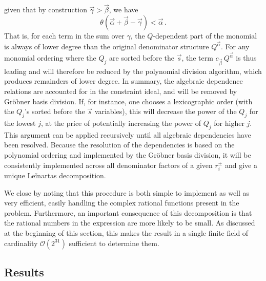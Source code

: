 given that by construction $\vec\gamma > \vec\beta$, we
have  
\begin{equation}
\theta(\vec\alpha + \vec\beta - \vec\gamma) < \vec\alpha\,.
\end{equation}
That is, for each term in the sum over $\gamma$, the $Q$-dependent part of the
monomial is always of lower degree than the original denominator 
structure $Q^{\vec{\alpha}}$.
For any monomial ordering where the $Q_j$ are sorted before the $\vec s$, the term  
$c_{\vec{\beta}}\,Q^{\vec{\alpha}}$ is thus leading and will 
therefore be reduced by the polynomial 
division algorithm, which produces remainders of lower degree.
In summary, the algebraic dependence relations are accounted for in the 
constraint ideal, and will be removed by Gröbner basis division. 
If, for instance,
one chooses 
a lexicographic order (with the $Q_j$'s sorted before the $\vec s$ variables), 
this will decrease the power of the $Q_j$ for the lowest $j$, 
at the price of potentially increasing the power of $Q_j$ for higher $j$.
This argument can be applied recursively until all algebraic dependencies have been 
resolved. Because the resolution of the dependencies is based on the polynomial ordering
and implemented by the Gröbner basis division, it will be
consistently implemented across all denominator factors of a given $r_i^{\pm}$ and
give a unique Leǐnartas decomposition.


We close by noting that this procedure is both simple to implement as
well as very efficient, easily handling the complex rational functions
present in the problem.  Furthermore, an important consequence of this
decomposition is that the rational numbers in the expression are
more likely to be small. As discussed at the beginning of this section,
this makes the result in a single finite field of cardinality $\mathcal{O}(2^{31})$ 
sufficient to determine them.



\subsection{Results}



